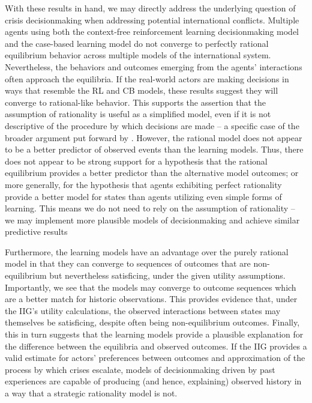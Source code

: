 With these results in hand, we may directly address the underlying question of crisis decisionmaking when addressing potential international conflicts. Multiple agents using both the context-free reinforcement learning decisionmaking model and the case-based learning model do not converge to perfectly rational equilibrium behavior across multiple models of the international system. Nevertheless, the behaviors and outcomes emerging from the agents' interactions often approach the equilibria. If the real-world actors are making decisions in ways that resemble the RL and CB models, these results suggest they will converge to rational-like behavior. This supports the assertion that the assumption of rationality is useful as a simplified model, even if it is not descriptive of the procedure by which decisions are made -- a specific case of the broader argument put forward by \citet{friedman_1953}. However, the rational model does not appear to be a better predictor of observed events than the learning models. Thus, there does not appear to be strong support for a hypothesis that the rational equilibrium provides a better predictor than the alternative model outcomes; or more generally, for the hypothesis that agents exhibiting perfect rationality provide a better model for states than agents utilizing even simple forms of learning. This means we do not need to rely on the assumption of rationality -- we may implement more plausible models of decisionmaking and achieve similar predictive results

Furthermore, the learning models have an advantage over the purely rational model in that they can converge to sequences of outcomes that are non-equilibrium but nevertheless satisficing, under the given utility assumptions. Importantly, we see that the models may converge to outcome sequences which are a better match for historic observations. This provides evidence that, under the IIG's utility calculations, the observed interactions between states may themselves be satisficing, despite often being non-equilibrium outcomes. Finally, this in turn suggests that the learning models provide a plausible explanation for the difference between the equilibria and observed outcomes. If the IIG provides a valid estimate for actors' preferences between outcomes and approximation of the process by which crises escalate, models of decisionmaking driven by past experiences are capable of producing (and hence, explaining) observed history in a way that a strategic rationality model is not.

